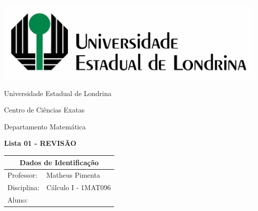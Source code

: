 \documentclass[oneside,a4paper,12pt]{article}
\newcommand{\universidade}{Universidade Estadual de Londrina}
\newcommand{\centro}{Centro de Ciências Exatas}
\newcommand{\departamento}{Departamento Matemática}
\newcommand{\curso}{Física}
\newcommand{\professores}{Matheus Pimenta}
\newcommand{\disciplina}{Cálculo I - 1MAT096}
\begin{document}
	\pagestyle{empty}
	
	\begin{center}
		\includegraphics[width=\linewidth/2]{logo.jpg}%
	 	\vspace{2pt} 	
		
		\universidade
		\par
		\centro
		\par
		\departamento
		\par
		\par
		\vspace{12pt}
		\LARGE \textbf{Lista 01 - REVISÃO}
		
	\end{center}
	
	\vspace{12pt}
	
	\begin{tabular}{ |l|p{12cm}| }
		
		\hline
		\multicolumn{2}{|c|}{\textbf{Dados de Identificação}} \\
		\hline
		Professor:         &    \professores           \\
		\hline
		Disciplina:        &    \disciplina          \\
		\hline
		Aluno:             &                   \\
		\hline
		
	\end{tabular}
	\vspace{6pt}
	
	
	\begin{snugshade}
	\end{snugshade}
\end{document}
